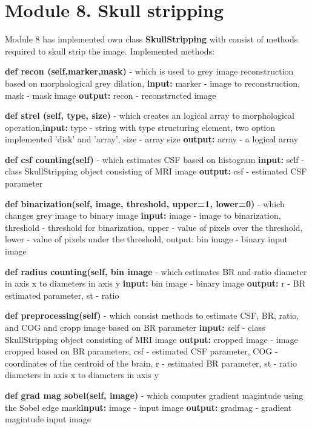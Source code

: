 \section{Module 8. Skull stripping}
Module 8 has implemented own class \textbf{SkullStripping} with consist of methods required to skull strip the image.
Implemented methods:
\begin{itemize}
    \item {\textbf{def recon (self,marker,mask)} - which is used to grey image reconstruction based on morphological grey dilation, \textbf{input:} marker - image to reconstruction, mask - mask image \textbf{output:} recon - reconstructed image}
    \item {\textbf{def strel (self, type, size)} - which creates an logical array to morphological operation,\textbf{input:} type - string with type structuring element, two option implemented 'disk' and 'array', size - array size \textbf{output:} array - a logical array}
    \item {\textbf{def csf counting(self)} - which estimates CSF based on histogram \textbf{input:} self - class SkullStripping object consisting of MRI image  \textbf{output:}  csf - estimated CSF parameter}
    \item {\textbf{def binarization(self, image, threshold, upper=1, lower=0)} - which changes grey image to binary image
    \textbf{input:} image - image to binarization, threshold - threshold for binarization, upper - value of pixels over the threshold, lower - value of pixels under the threshold, output: bin image - binary input image}
    \item {\textbf{def radius counting(self, bin image} - which estimates BR and ratio diameter in axis x to diameters in axis y \textbf{input:} bin image - binary image \textbf{output:} r - BR estimated parameter, st - ratio}
    \item {\textbf{def preprocessing(self)} - which consist methods to estimate CSF, BR, ratio, and COG and cropp image based on BR parameter \textbf{input:} self - class SkullStripping object consisting of MRI image \textbf{output:} cropped image - image cropped based on BR parameters, csf - estimated CSF parameter, COG - coordinates of the centroid of the brain, r - estimated BR parameter, st - ratio diameters in axis x to diameters in axis y
    \item {\textbf{def grad mag sobel(self, image)} - which computes gradient magintude using the Sobel edge mask\textbf{input:} image - input image \textbf{output:}  gradmag - gradient magintude input image}
}
\end{itemize}
